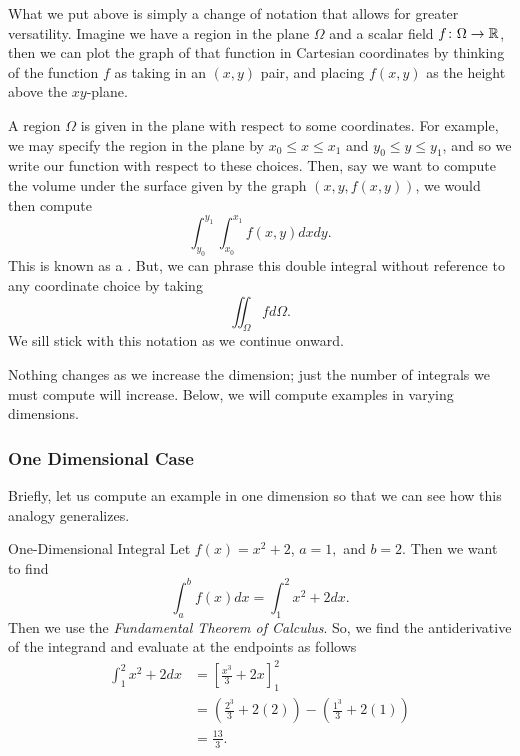                 What we put above is simply a change of notation that allows for greater versatility.  Imagine we have a region in the plane $\Omega$ and a scalar field $f\colon \Omega \to \mathbb{R}$, then we can plot the graph of that function in Cartesian coordinates by thinking of the function $f$ as taking in an $(x,y)$ pair, and placing $f(x,y)$ as the height above the $xy$-plane.
                \begin{figure}[H]
                	\centering
                	\def\svgwidth{0.75\columnwidth}
                	
                \end{figure}
                A region $\Omega$ is given in the plane with respect to some coordinates.  For example, we may specify the region in the plane by $x_0 \leq x \leq x_1$ and $y_0 \leq y \leq y_1$, and so we write our function with respect to these choices.  Then, say we want to compute the volume under the surface given by the graph $(x,y,f(x,y))$, we would then compute
                \[
                \int_{y_0}^{y_1} \int_{x_0}^{x_1} f(x,y)dxdy.
                \]
                This is known as a .  But, we can phrase this double integral without reference to any coordinate choice by taking
                \[
                \iint_\Omega f d\Omega.
                \]
             	We sill stick with this notation as we continue onward.

             	Nothing changes as we increase the dimension; just the number of integrals we must compute will increase.  Below, we will compute examples in varying dimensions.



             	        \subsubsection{One Dimensional Case}
             	        Briefly, let us compute an example in one dimension so that we can see how this analogy generalizes.

             	        \begin{ex}{One-Dimensional Integral}
             	        Let $f(x) = x^2+2$, $a=1,$ and $b=2$. Then we want to find
             	        \[
             	        \int_a^b f(x)dx = \int_1^2 x^2+2dx.
             	        \]
             	        Then we use the \emph{Fundamental Theorem of Calculus}. So, we find the antiderivative of the integrand and evaluate at the endpoints as follows
             	        \begin{align*}
             	            \int_1^2 x^2+2dx &= \left[ \frac{x^3}{3}+2x\right]_1^2\\
             	            &= \left(\frac{2^3}{3}+2(2)\right) - \left( \frac{1^3}{3}+2(1)\right)\\
             	            &= \frac{13}{3}.
             	        \end{align*}
             	        \end{ex}

